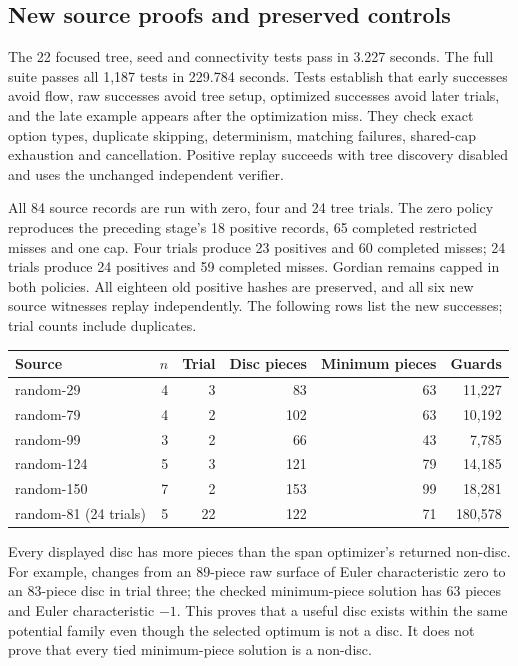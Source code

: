 \subsection{New source proofs and preserved controls}

The 22 focused tree, seed and connectivity tests pass in 3.227 seconds.
The full suite passes all 1,187 tests in 229.784 seconds. Tests establish
that early successes avoid flow, raw successes avoid tree setup, optimized
successes avoid later trials, and the late example appears after the
optimization miss. They check exact option types, duplicate skipping,
determinism, matching failures, shared-cap exhaustion and cancellation.
Positive replay succeeds with tree discovery disabled and uses the
unchanged independent verifier.

All 84 source records are run with zero, four and 24 tree trials. The zero
policy reproduces the preceding stage's 18 positive records, 65 completed
restricted misses and one cap. Four trials produce 23 positives and 60
completed misses; 24 trials produce 24 positives and 59 completed misses.
Gordian remains capped in both policies. All eighteen old positive hashes
are preserved, and all six new source witnesses replay independently.
The following rows list the new successes; trial counts include duplicates.

\begin{center}
\small
\begin{tabular}{lrrrrr}
\toprule
Source & $n$ & Trial & Disc pieces & Minimum pieces & Guards \\
\midrule
random-29 & 4 & 3 & 83 & 63 & 11,227 \\
random-79 & 4 & 2 & 102 & 63 & 10,192 \\
random-99 & 3 & 2 & 66 & 43 & 7,785 \\
random-124 & 5 & 3 & 121 & 79 & 14,185 \\
random-150 & 7 & 2 & 153 & 99 & 18,281 \\
random-81 (24 trials) & 5 & 22 & 122 & 71 & 180,578 \\
\bottomrule
\end{tabular}
\end{center}

Every displayed disc has more pieces than the span optimizer's returned
non-disc. For example,  changes from an 89-piece raw
surface of Euler characteristic zero to an 83-piece disc in trial three;
the checked minimum-piece solution has 63 pieces and Euler characteristic
$-1$. This proves that a useful disc exists within the same potential
family even though the selected optimum is not a disc. It does not prove
that every tied minimum-piece solution is a non-disc.

